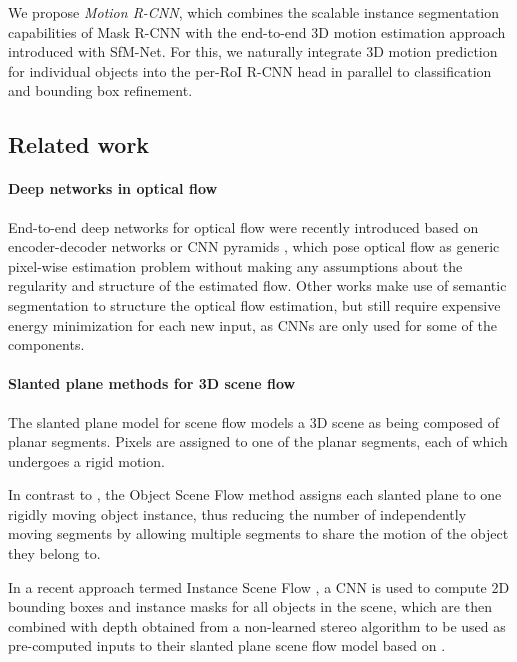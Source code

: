 We propose \emph{Motion R-CNN}, which combines the scalable instance segmentation capabilities of
Mask R-CNN with the end-to-end 3D motion estimation approach introduced with SfM-Net.
For this, we naturally integrate 3D motion prediction for individual objects into the per-RoI R-CNN head
in parallel to classification and bounding box refinement.

\subsection{Related work}

\paragraph{Deep networks in optical flow}

End-to-end deep networks for optical flow were recently introduced
based on encoder-decoder networks or CNN pyramids \cite{FlowNet, FlowNet2, SPyNet},
which pose optical flow as generic pixel-wise estimation problem without making any assumptions
about the regularity and structure of the estimated flow.
Other works \cite{FlowLayers, ESI, MRFlow} make use of semantic segmentation to structure
the optical flow estimation, but still require expensive energy minimization for each
new input, as CNNs are only used for some of the components.

\paragraph{Slanted plane methods for 3D scene flow}
The slanted plane model for scene flow \cite{PRSF, PRSM} models a 3D scene as being
composed of planar segments. Pixels are assigned to one of the planar segments,
each of which undergoes a rigid motion.

In contrast to \cite{PRSF, PRSM}, the Object Scene Flow method \cite{KITTI2015}
assigns each slanted plane to one rigidly moving object instance, thus
reducing the number of independently moving segments by allowing multiple
segments to share the motion of the object they belong to.

In a recent approach termed Instance Scene Flow \cite{InstanceSceneFlow},
a CNN is used to compute 2D bounding boxes and instance masks for all objects in the scene, which are then combined
with depth obtained from a non-learned stereo algorithm to be used as pre-computed
inputs to their slanted plane scene flow model based on \cite{KITTI2015}.

